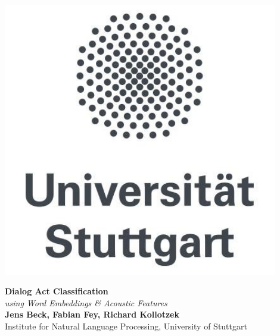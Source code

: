 \documentclass[a0,landscape]{a0poster}
\begin{document}



\begin{minipage}[b]{0.20\linewidth}
	\centering\includegraphics[width=12cm]{Bilder/logo_UniStuttgart.jpg} %
\end{minipage}
%
\begin{minipage}[b]{0.60\linewidth}
	\veryHuge \centering\color{DodgerBlue} \textbf{Dialog Act Classification}\\ %
	\Huge\textit{using Word Embeddings \& Acoustic Features} \color{Black}\\[1cm] %
	\huge \textbf{Jens Beck, Fabian Fey, Richard Kollotzek}\\ %
	\huge Institute for Natural Language Processing, University of Stuttgart\\ %
	\vspace{1.5cm}
\end{minipage}
\end{document}

